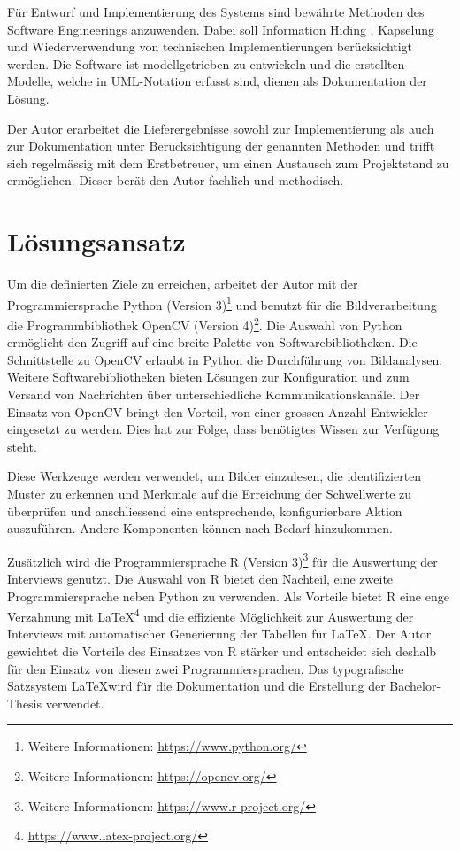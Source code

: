 Für Entwurf und Implementierung des Systems sind bewährte Methoden des Software Engineerings anzuwenden. Dabei soll Information Hiding \citep[S. 764]{Sommerville2016}, Kapselung \citep[S. 150]{Deck2010} und Wiederverwendung von technischen Implementierungen \citep[S. 140]{Deck2010} berücksichtigt werden. Die Software ist modellgetrieben zu entwickeln und die erstellten Modelle, welche in UML-Notation erfasst sind, dienen als Dokumentation der Lösung.

Der Autor erarbeitet die Lieferergebnisse sowohl zur Implementierung als auch zur Dokumentation unter Berücksichtigung der genannten Methoden und trifft sich regelmässig mit dem Erstbetreuer, um einen Austausch zum Projektstand zu ermöglichen. Dieser berät den Autor fachlich und methodisch.

\section{Lösungsansatz}

Um die definierten Ziele zu erreichen, arbeitet der Autor mit der Programmiersprache Python (Version 3)\footnote{Weitere Informationen: \url{https://www.python.org/}} und benutzt für die Bildverarbeitung die Programmbibliothek OpenCV (Version 4)\footnote{Weitere Informationen: \url{https://opencv.org/}}. Die Auswahl von Python ermöglicht den Zugriff auf eine breite Palette von Softwarebibliotheken. Die Schnittstelle zu OpenCV erlaubt in Python die Durchführung von Bildanalysen. Weitere Softwarebibliotheken bieten Lösungen zur Konfiguration und zum Versand von Nachrichten über unterschiedliche Kommunikationskanäle. Der Einsatz von OpenCV bringt den Vorteil, von einer grossen Anzahl Entwickler eingesetzt zu werden. Dies hat zur Folge, dass benötigtes Wissen zur Verfügung steht. 

Diese Werkzeuge werden verwendet, um Bilder einzulesen, die identifizierten Muster zu erkennen und Merkmale auf die Erreichung der Schwellwerte zu überprüfen und anschliessend eine entsprechende, konfigurierbare Aktion auszuführen. Andere Komponenten können nach Bedarf hinzukommen.

Zusätzlich wird die Programmiersprache R (Version 3)\footnote{Weitere Informationen: \url{https://www.r-project.org/}} für die Auswertung der Interviews genutzt. Die Auswahl von R bietet den Nachteil, eine zweite Programmiersprache neben Python zu verwenden. Als Vorteile bietet R eine enge Verzahnung mit \LaTeX\footnote{\url{https://www.latex-project.org/}} und die effiziente Möglichkeit zur Auswertung der Interviews mit automatischer Generierung der Tabellen für \LaTeX. Der Autor gewichtet die Vorteile des Einsatzes von R stärker und entscheidet sich deshalb für den Einsatz von diesen zwei Programmiersprachen. Das typografische Satzsystem \LaTeX wird für die Dokumentation und die Erstellung der Bachelor-Thesis verwendet.

